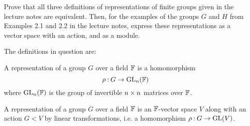 \documentclass[12pt]{memoir}
\begin{document}
\begin{Ej}[Exercise 1]
    Prove that all three definitions of representations of finite groups given in the lecture notes are equivalent. Then, for the examples of the groups $G$ and $H$ from Examples 2.1 and 2.2 in the lecture notes, express these representations as a vector space with an action, and as a module.
\end{Ej}

The definitions in question are:

\begin{Def}
A representation of a group $G$ over a field $\mathbb{F}$ is a homomorphism 
$$\rho\mathbin{:} G\to\mathrm{GL}_n(\mathbb{F})$$
where $\mathrm{GL}_n(\mathbb{F})$ is the group of invertible $n\times n$ matrices over $\mathbb{F}$.
\end{Def}

\begin{Def}
A representation of a group $G$ over a field $\mathbb{F}$ is an $\mathbb{F}$-vector space $V$ along with an action $G\lt V$ by linear transformations, i.e. a homomorphism $\rho\mathbin{:} G\to\mathrm{GL}(V)$.
\end{Def}
\end{document}
